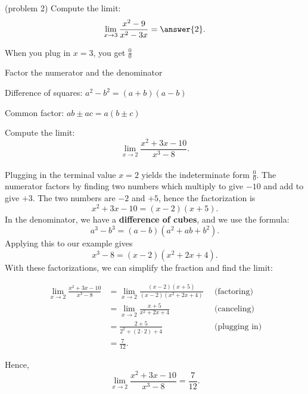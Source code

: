 \documentclass{ximera}
\begin{document}
\begin{problem}(problem 2)
  Compute the limit:
  \[  \lim_{x \to 3} \frac{x^2 - 9}{x^2 - 3x} = \answer{2}.  \]
    \begin{hint}
      When you plug in $x = 3$, you get $\frac00$
    \end{hint}
    \begin{hint}
      Factor the numerator and the denominator
    \end{hint}
    \begin{hint}
      Difference of squares: $a^2 - b^2 = (a+b)(a-b)$
    \end{hint}
    \begin{hint}
      Common factor: $ab \pm ac = a(b \pm c)$
    \end{hint}
\end{problem}


\begin{example}[example 3]
Compute the limit: \[\lim_{x \to 2} \frac{x^2 + 3x - 10}{x^3 - 8}.\]
\\
Plugging in the terminal value $x = 2$ yields the indeterminate form $\frac00$.
The numerator factors  by finding two numbers which multiply to give $-10$ and add to give $+3$.  
The two numbers are 
$-2$ and $+5$, hence the factorization is  
\[x^2 + 3x - 10 = (x-2)(x+5).\]
In the denominator, we have a \textbf{difference of cubes}, and we use the formula:
\[a^3 - b^3 = (a-b)(a^2+ab +b^2).\]
Applying this to our example gives 
\[x^3 - 8 = (x-2)(x^2 + 2x + 4).\]
With these factorizations, we can simplify the fraction and find the limit:

\begin{align*}
\lim_{x \to 2} \frac{x^2 + 3x - 10}{x^3 - 8} &= \lim_{x \to 2}\frac{(x-2)(x+5)}{(x-2)(x^2 + 2x + 4)} 
\enspace & \text{(factoring)} \\
&= \lim_{x \to 2} \frac{x+5}{x^2 + 2x + 4} & \text{(canceling)} \\
&= \frac{2+5}{2^2 + (2\cdot 2) + 4} & \text{(plugging in)} \\
&= \frac{7}{12}. 
\end{align*}

Hence,
\[\lim_{x \to 2} \frac{x^2 + 3x - 10}{x^3 - 8} = \frac{7}{12}.\]
\end{example}
\end{document}
